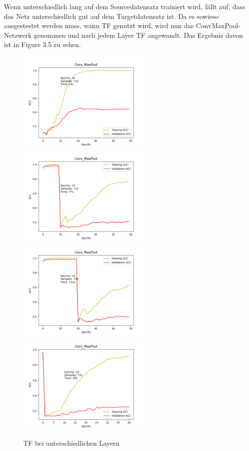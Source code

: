 Wenn unterschiedlich lang auf dem Sourcedatensatz trainiert wird, fällt auf, dass das Netz unterschiedlich gut auf dem Targetdatensatz ist. 
Da es sowieso ausgestestet werden muss, wann TF genutzt wird, wird nun das ConvMaxPool-Netzwerk genommen und nach jedem Layer TF angewandt. 
Das Ergebnis davon ist in Figure 3.5 zu sehen. 

\begin{figure}[htpb]
    \includegraphics[height=5cm]{../../Plots/ba_plots/convmaxpool/wotr.png}
    \includegraphics[height=5cm]{../../Plots/ba_plots/convmaxpool/1TFtr.png}
    \includegraphics[height=5cm]{../../Plots/ba_plots/convmaxpool/2TFtr.png}
    \includegraphics[height=5cm]{../../Plots/ba_plots/convmaxpool/epochTFtr.png}
    \caption{\label{fig:layertf} TF bei unterschiedlichen Layern}
\end{figure}

